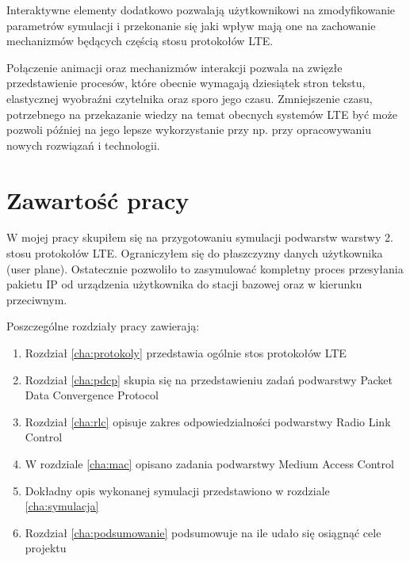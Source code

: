 Interaktywne elementy dodatkowo pozwalają użytkownikowi na zmodyfikowanie parametrów symulacji i przekonanie się jaki wpływ mają one na zachowanie mechanizmów będących częścią stosu protokołów LTE.

Połączenie animacji oraz mechanizmów interakcji pozwala na zwięzłe przedstawienie procesów, które obecnie wymagają dziesiątek stron tekstu, elastycznej wyobraźni czytelnika oraz sporo jego czasu. Zmniejszenie czasu, potrzebnego na przekazanie wiedzy na temat obecnych systemów LTE być może pozwoli później na jego lepsze wykorzystanie przy np. przy opracowywaniu nowych rozwiązań i technologii.

\section{Zawartość pracy}
\label{sec:zawartoscPracy}

W mojej pracy skupiłem się na przygotowaniu symulacji podwarstw warstwy 2. stosu protokołów LTE. Ograniczyłem się do płaszczyzny danych użytkownika (user plane). Ostatecznie pozwoliło to zasymulować kompletny proces przesyłania pakietu IP od urządzenia użytkownika do stacji bazowej oraz w kierunku przeciwnym.

Poszczególne rozdziały pracy zawierają:

\begin{enumerate}%

\item Rozdział \ref{cha:protokoly} przedstawia ogólnie stos protokołów LTE
\item Rozdział \ref{cha:pdcp} skupia się na przedstawieniu zadań podwarstwy Packet Data Convergence Protocol
\item Rozdział \ref{cha:rlc} opisuje zakres odpowiedzialności podwarstwy Radio Link Control
\item W rozdziale \ref{cha:mac} opisano zadania podwarstwy Medium Access Control\item Dokładny opis wykonanej symulacji przedstawiono w rozdziale \ref{cha:symulacja}
\item Rozdział \ref{cha:podsumowanie} podsumowuje na ile udało się osiągnąć cele projektu

\end{enumerate}
